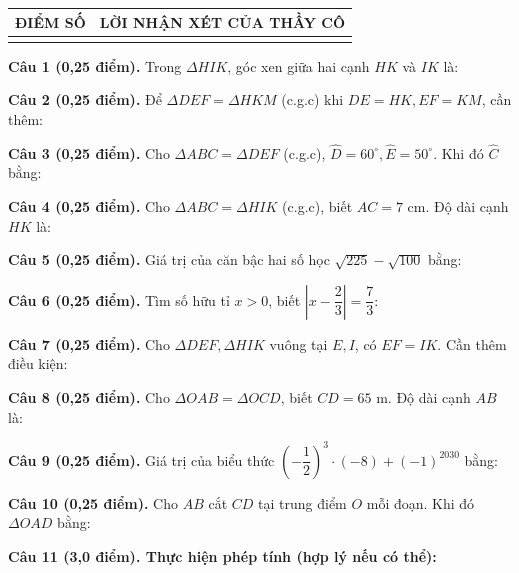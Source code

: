 \documentclass[12pt,a4paper]{article}
\begin{document}
\vspace{1.0mm}

\noindent
\begin{tabularx}{\linewidth}{|p{3.2cm}|X|}
\hline
\centering\textbf{ĐIỂM SỐ} & \centering\textbf{LỜI NHẬN XÉT CỦA THẦY CÔ} \tabularnewline
\hline
\rule{0pt}{1.8cm} & \tabularnewline
\hline
\end{tabularx}

\vspace{1.2mm}
\noindent\textbf{Câu 1 (0,25 điểm).} Trong $\Delta HIK$, góc xen giữa hai cạnh $HK$ và $IK$ là: \par\vspace{2.2mm}
\noindent\textbf{Câu 2 (0,25 điểm).} Để $\Delta DEF = \Delta HKM$ (c.g.c) khi $DE=HK, EF=KM$, cần thêm: \par\vspace{2.2mm}
\noindent\textbf{Câu 3 (0,25 điểm).} Cho $\Delta ABC = \Delta DEF$ (c.g.c), $\widehat{D}=60^\circ, \widehat{E}=50^\circ$. Khi đó $\widehat{C}$ bằng: \par\vspace{2.2mm}
\noindent\textbf{Câu 4 (0,25 điểm).} Cho $\Delta ABC = \Delta HIK$ (c.g.c), biết $AC = 7\text{ cm}$. Độ dài cạnh $HK$ là: \par\vspace{2.2mm}
\noindent\textbf{Câu 5 (0,25 điểm).} Giá trị của căn bậc hai số học $\sqrt{225} - \sqrt{100}$ bằng: \par\vspace{2.2mm}
\noindent\textbf{Câu 6 (0,25 điểm).} Tìm số hữu tỉ $x > 0$, biết $\left|x - \dfrac{2}{3}\right| = \dfrac{7}{3}$: \par\vspace{2.2mm}
\noindent\textbf{Câu 7 (0,25 điểm).} Cho $\Delta DEF, \Delta HIK$ vuông tại $E, I$, có $EF=IK$. Cần thêm điều kiện: \par\vspace{2.2mm}
\noindent\textbf{Câu 8 (0,25 điểm).} Cho $\Delta OAB = \Delta OCD$, biết $CD = 65\text{ m}$. Độ dài cạnh $AB$ là: \par\vspace{2.2mm}
\noindent\textbf{Câu 9 (0,25 điểm).} Giá trị của biểu thức $\left(-\dfrac{1}{2}\right)^3 \cdot (-8) + (-1)^{2030}$ bằng: \par\vspace{2.2mm}
\noindent\textbf{Câu 10 (0,25 điểm).} Cho $AB$ cắt $CD$ tại trung điểm $O$ mỗi đoạn. Khi đó $\Delta OAD$ bằng: \par\vspace{2.2mm}
\vspace{0.2mm}
\noindent\textbf{Câu 11 (3,0 điểm). Thực hiện phép tính (hợp lý nếu có thể):}
\vspace{0.6mm}
\end{document}
